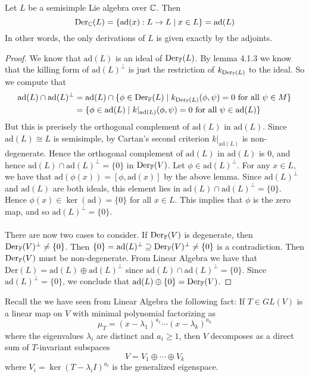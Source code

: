 \documentclass[a4paper]{article}
\begin{document}
\begin{prp}{}{} Let $L$ be a semisimple Lie algebra over $\mathbb{C}$. Then $$\text{Der}_{\mathbb{C}}(L)=\{\text{ad}(x):L\to L\;|\;x\in L\}=\text{ad}(L)$$ In other words, the only derivations of $L$ is given exactly by the adjoints. \tcbline
\begin{proof}
We know that $\text{ad}(L)$ is an ideal of $\text{Der}_{\mathbb{F}}(L)$. By lemma 4.1.3 we know that the killing form of $\text{ad}(L)^\perp$ is just the restriction of $k_{\text{Der}_{\mathbb{F}}(L)}$ to the ideal. So we compute that 
\begin{align*}
\text{ad}(L)\cap\text{ad}(L)^\perp&=\text{ad}(L)\cap\{\phi\in\text{Der}_{\mathbb{F}}(L)\;|\;k_{\text{Der}_{\mathbb{F}}(L)}(\phi,\psi)=0\text{ for all }\psi\in M\}\\
&=\{\phi\in\text{ad}(L)\;|\;k|_{\text{ad}(L)}(\phi,\psi)=0\text{ for all }\psi\in\text{ad}(L)\}
\end{align*}
But this is precisely the orthogonal complement of $\text{ad}(L)$ in $\text{ad}(L)$. Since $\text{ad}(L)\cong L$ is semisimple, by Cartan's second criterion $k|_{\text{ad}(L)}$ is non-degenerate. Hence the orthogonal complement of $\text{ad}(L)$ in $\text{ad}(L)$ is $0$, and hence $\text{ad}(L)\cap\text{ad}(L)^\perp=\{0\}$ in $\text{Der}_{\mathbb{F}}(V)$. Let $\phi\in\text{ad}(L)^\perp$. For any $x\in L$, we have that $\text{ad}(\phi(x))=[\phi,\text{ad}(x)]$ by the above lemma. Since $\text{ad}(L)^\perp$ and $\text{ad}(L)$ are both ideals, this element lies in $\text{ad}(L)\cap\text{ad}(L)^\perp=\{0\}$. Hence $\phi(x)\in\ker(\text{ad})=\{0\}$ for all $x\in L$. This implies that $\phi$ is the zero map, and so $\text{ad}(L)^\perp=\{0\}$. \\~\\

There are now two cases to consider. If $\text{Der}_{\mathbb{F}}(V)$ is degenerate, then $\text{Der}_{\mathbb{F}}(V)^\perp\neq\{0\}$. Then $\{0\}=\text{ad}(L)^\perp\supseteq\text{Der}_{\mathbb{F}}(V)^\perp\neq\{0\}$ is a contradiction. Then $\text{Der}_{\mathbb{F}}(V)$ must be non-degenerate. From Linear Algebra we have that $\text{Der}(L)=\text{ad}(L)\oplus\text{ad}(L)^\perp$ since $\text{ad}(L)\cap\text{ad}(L)^\perp=\{0\}$. Since $\text{ad}(L)^\perp=\{0\}$, we conclude that $\text{ad}(L)\oplus\{0\}=\text{Der}_{\mathbb{F}}(V)$. 
\end{proof}
\end{prp}

Recall the we have seen from Linear Algebra the following fact: If $T\in GL(V)$ is a linear map on $V$ with minimal polynomial factorizing as $$\mu_T=(x-\lambda_1)^{a_1}\cdots(x-\lambda_k)^{a_k}$$ where the eigenvalues $\lambda_i$ are distinct and $a_i\geq 1$, then $V$ decomposes as a direct sum of $T$-invariant subspaces $$V=V_1\oplus\cdots\oplus V_k$$ where $V_i=\ker(T-\lambda_i I)^{a_i}$ is the generalized eigenspace. 
\end{document}
